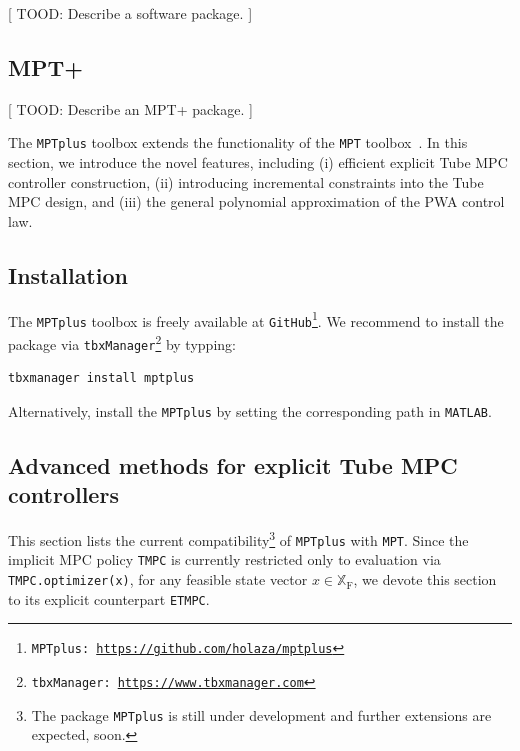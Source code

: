 \documentclass[letterpaper, 10 pt, conference]{ieeeconf}
\begin{document}
[ TOOD: Describe a software package. ]

\subsection{MPT+}
\label{sec:code_mptplus}

[ TOOD: Describe an MPT+ package. ]

The \texttt{MPTplus} toolbox extends the functionality of the \texttt{MPT} toolbox~\cite{MPT3}. In this section, we introduce the novel features, including (i) efficient explicit Tube MPC controller construction, (ii) introducing incremental constraints into the Tube MPC design, and (iii) the general polynomial approximation of the PWA control law. 

\subsection{Installation}
\label{sec:installation}

The \texttt{MPTplus} toolbox is freely available at \texttt{GitHub}\footnote{\texttt{MPTplus: \url{https://github.com/holaza/mptplus}}}. We recommend to install the package via \texttt{tbxManager}\footnote{\texttt{tbxManager: \url{https://www.tbxmanager.com}}} by typping:
\begin{lstlisting}[style=Matlab-editor]
	tbxmanager install mptplus
\end{lstlisting}
Alternatively, install the \texttt{MPTplus} by setting the corresponding path in \texttt{MATLAB}. 

\subsection{Advanced methods for explicit Tube MPC controllers}
\label{sec:advanced_method}

This section lists the current compatibility\footnote{The package \texttt{MPTplus} is still under development and further extensions are expected, soon.} of \texttt{MPTplus} with \texttt{MPT}. 
%
Since the implicit MPC policy \verb|TMPC| is currently restricted only to evaluation via \verb|TMPC.optimizer(x)|, for any feasible state vector $x\in\mathbb{X}_{\mathrm{F}}$, we devote this section to its explicit counterpart \verb|ETMPC|.
\end{document}

